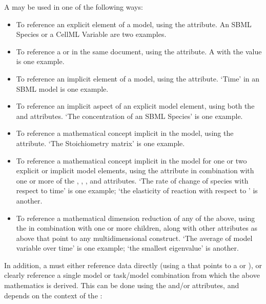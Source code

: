 \begin{blockChanged}
A \Variable may be used in one of the following ways:
\begin{itemize}
        \item To reference an explicit element of a model, using the  attribute.  An SBML Species or a CellML Variable are two examples.
        \item To reference a \DataGenerator or \DataSource in the same document, using the  attribute.  A  with the value  is one example.
        \item To reference an implicit element of a model, using the  attribute.  `Time' in an SBML model is one example.
        \item To reference an implicit aspect of an explicit model element, using both the  and  attributes.  `The concentration of an SBML Species' is one example.
        \item To reference a mathematical concept implicit in the model, using the  attribute.  `The Stoichiometry matrix' is one example.
        \item To reference a mathematical concept implicit in the model for one or two explicit or implicit model elements, using the  attribute in combination with one or more of the , , , and  attributes.  `The rate of change of species  with respect to time' is one example; `the elasticity of reaction  with respect to ' is another.
        \item To reference a mathematical dimension reduction of any of the above, using the  in combination with one or more \AppliedDimension children, along with other attributes as above that point to any multidimensional construct.  `The average of model variable  over time' is one example; `the smallest eigenvalue' is another.
\end{itemize}

In addition, a \Variable must either reference data directly (using a  that points to a \DataSource or \DataGenerator), or clearly reference a single model or task/model combination from which the above mathematics is derived.  This can be done using the  and/or  attributes, and depends on the context of the \Variable:


\end{blockChanged}
